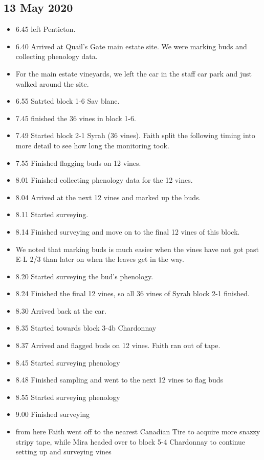 \documentclass[11pt,letter]{article}
\newenvironment{smitemize}{
\begin{itemize}
  \setlength{\itemsep}{0pt}
  \setlength{\parskip}{0.8pt}
  \setlength{\parsep}{0pt}}
{\end{itemize}
}
\begin{document}
\begin{smitemize}
\end{smitemize}


\subsection {13 May 2020}
\begin{smitemize}
\item 6.45 left Penticton.
\item 6.40 Arrived at Quail's Gate main estate site. We were marking buds and collecting phenology data.
\item For the main estate vineyards, we left the car in the staff car park and just walked around the site. 
\item 6.55 Satrted block 1-6 Sav blanc.
\item 7.45 finished the 36 vines in block 1-6.
\item 7.49 Started block 2-1 Syrah (36 vines). Faith split the following timing into more detail to see how long the monitoring took. 
\item 7.55 Finished flagging buds on 12 vines.
\item 8.01 Finished collecting phenology data for the 12 vines.
\item 8.04 Arrived at the next 12 vines and marked up the buds.
\item 8.11 Started surveying.
\item 8.14 Finished surveying and move on to the final 12 vines of this block.
\item We noted that marking buds is much easier when the vines have not got past E-L 2/3 than later on when the leaves get in the way. 
\item 8.20 Started surveying the bud's phenology.
\item 8.24 Finished the final 12 vines, so all 36 vines of Syrah block 2-1 finished.
\item 8.30 Arrived back at the car.  
\item 8.35 Started towards block 3-4b Chardonnay
\item 8.37 Arrived and flagged buds on 12 vines. Faith ran out of tape. 
\item 8.45 Started surveying phenology 
\item 8.48 Finished sampling and went to the next 12 vines to flag buds
\item 8.55 Started surveying phenology 
\item 9.00 Finished surveying 
\item from here Faith went off to the nearest Canadian Tire to acquire more snazzy stripy tape, while Mira headed over to block 5-4 Chardonnay to continue setting up and surveying vines

\end{smitemize}
\end{document}
